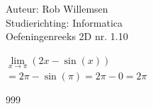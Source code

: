 \documentclass[a4paper]{article}
\begin{document}
\noindent \large Auteur: Rob Willemsen \\
\noindent \large Studierichting: Informatica\\
\noindent \large Oefeningenreeks 2D nr. 1.10\\

\medskip

\normalsize

$\lim\limits_{x \rightarrow \pi} (2x - \sin (x))$ \\ 

$= 2\pi - \sin (\pi) = 2\pi - 0 = 2\pi$ \\

\begin{thebibliography}{999}
\end{thebibliography}
\end{document}
